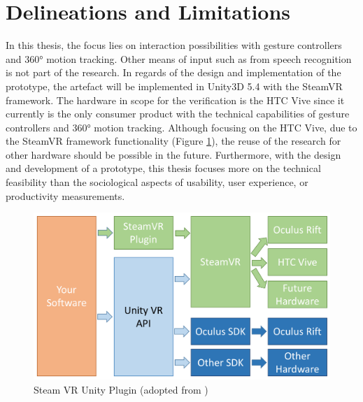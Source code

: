 



\section{Delineations and Limitations}

In this thesis, the focus lies on interaction possibilities with gesture controllers and 360° motion tracking. Other means of input such as from speech recognition is not part of the research.
In regards of the design and implementation of the prototype, the artefact will be implemented in Unity3D 5.4 with the SteamVR framework. The hardware in scope for the verification is the HTC Vive since it currently is the only consumer product with the  technical capabilities of gesture controllers and 360° motion tracking. Although focusing on the HTC Vive, due to the SteamVR framework functionality (Figure \ref{fig:steamvr}), the reuse of the research for other hardware should be possible in the future. \newline
Furthermore, with the design and development of a prototype, this thesis focuses more on the technical feasibility than the sociological aspects of usability, user experience, or productivity measurements. 
\begin{figure}[h]
	\begin{center}
		\includegraphics[width=14cm]{03_Figures/04_Valve/OpenVR_SteamVR.png}
		\caption[Steam VR Unity Plugin]{Steam VR Unity Plugin (adopted from \cite{Valve2016})}
		\label{fig:steamvr}
	\end{center}
\end{figure}


